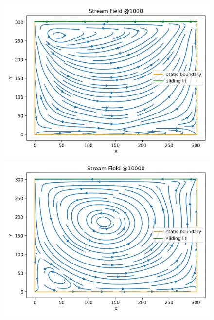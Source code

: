 \begin{figure}[H]
    \begin{minipage}{0.5\textwidth}
        \includegraphics[width=\linewidth]{graphs/SlidingLit/stream_field_1000}
    \end{minipage}%
    \begin{minipage}{0.5\textwidth}
        \includegraphics[width=\linewidth]{graphs/SlidingLit/stream_field_10000}
    \end{minipage}
    \begin{minipage}{0.5\textwidth}

\end{minipage}
\end{figure}
